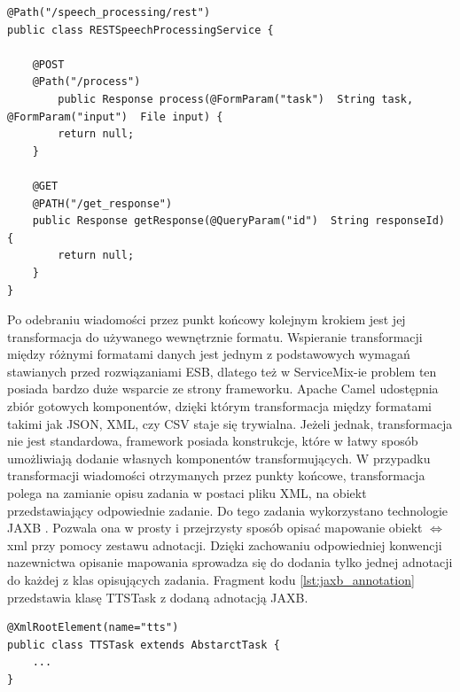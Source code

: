 \lstset{language=Java, tabsize=4, caption=Definicja REST-owego punktu końcowego.,label=lst:rest_service}


\begin{center}
\begin{lstlisting}
@Path("/speech_processing/rest")
public class RESTSpeechProcessingService {

	@POST
	@Path("/process")
    	public Response process(@FormParam("task")  String task, @FormParam("input")  File input) {
		return null;
	}

	@GET
	@PATH("/get_response")
	public Response getResponse(@QueryParam("id")  String responseId) {
		return null;
	}
}

\end{lstlisting}
\end{center}

Po odebraniu wiadomości przez punkt końcowy kolejnym krokiem jest jej transformacja do używanego wewnętrznie formatu. Wspieranie transformacji między różnymi formatami danych jest jednym z podstawowych wymagań stawianych przed rozwiązaniami ESB, dlatego też w ServiceMix-ie problem ten posiada bardzo duże wsparcie ze strony frameworku. Apache Camel udostępnia zbiór gotowych komponentów, dzięki którym transformacja między formatami takimi jak JSON, XML, czy CSV staje się trywialna. Jeżeli jednak, transformacja nie jest standardowa, framework posiada konstrukcje, które w łatwy sposób umożliwiają dodanie własnych komponentów transformujących. W przypadku transformacji wiadomości otrzymanych przez punkty końcowe, transformacja polega na zamianie opisu zadania w postaci pliku XML, na obiekt przedstawiający odpowiednie zadanie. Do tego zadania wykorzystano technologie JAXB \cite{jaxb2008}. Pozwala ona w prosty i przejrzysty sposób opisać mapowanie obiekt \begin{math}\Leftrightarrow\end{math} xml przy pomocy zestawu adnotacji. Dzięki zachowaniu odpowiedniej konwencji nazewnictwa opisanie mapowania sprowadza się do dodania tylko jednej adnotacji do każdej z klas opisujących zadania. Fragment kodu \ref{lst:jaxb_annotation} przedstawia klasę TTSTask z dodaną adnotacją JAXB.


\lstset{language=Java, tabsize=4, caption=Definicja klasy TTSTask wraz z adnotacjami JAXB .,label=lst:jaxb_annotation}

\begin{center}
\begin{lstlisting}
@XmlRootElement(name="tts")
public class TTSTask extends AbstarctTask {
	...
}
\end{lstlisting}
\end{center}


